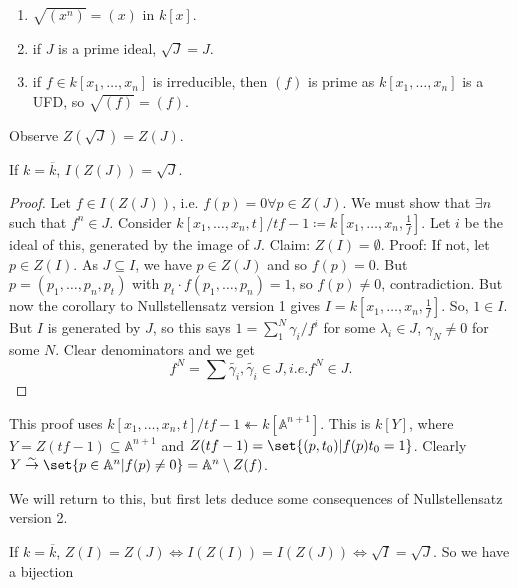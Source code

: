 \documentclass{article}
\newcommand{\A}{\mathbb{A}}
\begin{document}
\begin{eg}
    \begin{enumerate}[label=(\arabic*)]
        \item $\sqrt{(x^n)} = (x)$ in $k[x]$.
        \item if $J$ is a prime ideal, $\sqrt{J} = J$.
        \item if $f \in k[x_1, \dotsc, x_n]$ is irreducible, then $(f)$ is prime as $k[x_1, \dotsc, x_n]$ is a UFD, so $\sqrt{(f)} = (f)$.
    \end{enumerate}
\end{eg}
Observe $Z(\sqrt{J}) = Z(J)$.
\begin{thm}[Nullstellensatz, v2]
    If $k = \overline{k}$, $I(Z(J)) = \sqrt{J}$.
\end{thm}
\begin{proof}
    Let $f \in I(Z(J))$, i.e. $f(p) = 0 \forall p \in Z(J)$. We must show that $\exists n$ such that $f^n \in J$.
    Consider $k[x_1, \dotsc, x_n, t]/tf-1 \coloneqq k[x_1, \dotsc, x_n, \frac{1}{f}]$.
    Let $i$ be the ideal of this, generated by the image of $J$.
    Claim: $Z(I) = \emptyset$. Proof: If not, let $p \in Z(I)$. As $J \subseteq I$, we have $p \in Z(J)$ and so $f(p) = 0$. But $p=(p_1, \dotsc, p_n, p_t)$ with $p_t \cdot f(p_1, \dotsc, p_n) = 1$, so $f(p) \neq 0$, contradiction.
    But now the corollary to Nullstellensatz version 1 gives $I=k[x_1, \dotsc, x_n, \frac{1}{f}]$. So, $1 \in I$. But $I$ is generated by $J$, so this says $1 = \sum_1^N \gamma_i/f^i$ for some $\lambda_i \in J$, $\gamma_N \neq 0$ for some $N$.
    Clear denominators and we get
    \begin{equation*}
        f^N = \sum \tilde{\gamma_i}, \tilde{\gamma_i} \in J, i.e. f^N \in J.
    \end{equation*}

\end{proof}
\begin{remark}
    This proof uses $k[x_1, \dotsc, x_n, t]/tf-1 \twoheadleftarrow k[\A^{n+1}]$. This is $k[Y]$, where $Y = Z(tf-1) \subseteq \A^{n+1}$ and $Z(tf-1) = \set{(p, t_0) | f(p) t_0 = 1}$.
    Clearly $Y \overset{\sim}{\rightarrow} \set{p \in \A^n | f(p) \neq 0} = \A^n \setminus Z(f)$.
\end{remark}
We will return to this, but first lets deduce some consequences of Nullstellensatz version 2.
\begin{cor}
    If $k = \overline{k}$, $Z(I) = Z(J) \iff I(Z(I)) = I(Z(J)) \iff \sqrt{I} = \sqrt{J}$.
    So we have a bijection

\end{cor}
\end{document}

